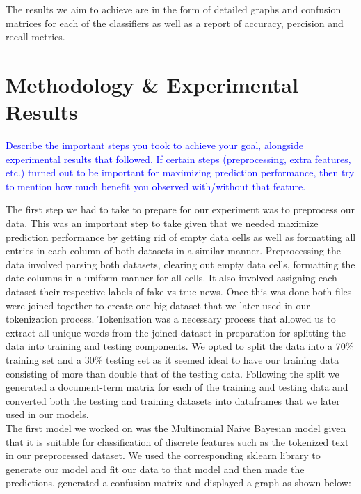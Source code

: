 \documentclass[10pt,twocolumn,letterpaper]{article}
\begin{document}
The results we aim to achieve are in the form of detailed graphs and confusion matrices for each of the classifiers as well as a report of accuracy, percision and recall metrics. 


\section{Methodology \& Experimental Results}

\textcolor{blue}{Describe the important steps you took to achieve your goal, alongside experimental results that followed. If certain steps (preprocessing, extra features, etc.) turned out to be important for maximizing prediction performance, then try to mention how much benefit you observed with/without that feature.}

The first step we had to take to prepare for our experiment was to preprocess our data. This was an important step to take given that we needed maximize prediction performance by getting rid of empty data cells as well as formatting all entries in each column of both datasets in a similar manner. Preprocessing the data involved parsing both datasets, clearing out empty data cells, formatting the date columns in a uniform manner for all cells. It also involved assigning each dataset their respective labels of fake vs true news. Once this was done  both files were joined together to create one big dataset that we later used in our tokenization process. Tokenization was a necessary process that allowed us to extract all unique words from the joined dataset in preparation for splitting the data into training and testing components. We opted to split the data into a 70\% training set and a 30\% testing set as it seemed ideal to have our training data consisting of more than double that of the testing data. Following the split we generated a document-term matrix for each of the training and testing data and converted both the testing and training datasets into dataframes that we later used in our models. \\

The first model we  worked on was the Multinomial Naive Bayesian model given that it is suitable for classification of discrete features such as the tokenized text in our preprocessed dataset. We used the corresponding sklearn library to generate our model and fit our data to that model and then made the predictions, generated a confusion matrix and displayed a graph as shown below:
\end{document}
